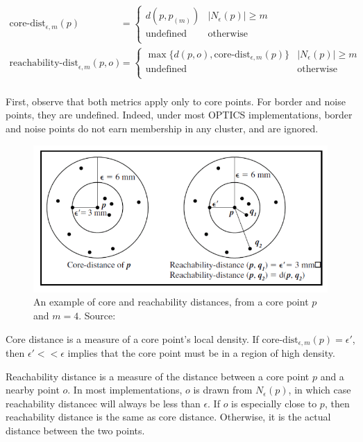 \begin{align}
    \text{core-dist}_{\epsilon, m}(p) &= 
        \begin{cases}
            d(p, p_{(m)}) & |N_\epsilon(p)| \geq m \\
            \text{undefined} & \text{otherwise} \\
        \end{cases}\\
    \text{reachability-dist}_{\epsilon, m}(p, o) &= 
        \begin{cases}
            \max \lbrace d(p, o), \text{core-dist}_{\epsilon, m} (p) \rbrace & |N_\epsilon(p)| \geq m \\
            \text{undefined} & \text{otherwise} \\
        \end{cases}\\
\end{align}

First, observe that both metrics apply only to core points. For border and noise points, they are undefined. Indeed, under most OPTICS implementations, border and noise points do not earn membership in any cluster, and are ignored.

\begin{figure}[h]
\centering
\includegraphics[scale=0.42]{chapter_2/files/optics_distances.png}
\caption{An example of core and reachability distances, from a core point $p$ and $m=4$. Source: \cite{medium:optics}}
\label{fig:dbscan_plus}
\end{figure}

Core distance is a measure of a core point's local density. If $\text{core-dist}_{\epsilon, m}(p) = \epsilon'$, then $\epsilon' << \epsilon$ implies that the core point must be in a region of high density.

Reachability distance is a measure of the distance between a core point $p$ and a nearby point $o$. In most implementations, $o$ is drawn from $N_\epsilon(p)$, in which case reachability distancec will always be less than $\epsilon$. If $o$ is especially close to $p$, then reachability distance is the same as core distance. Otherwise, it is the actual distance between the two points.

